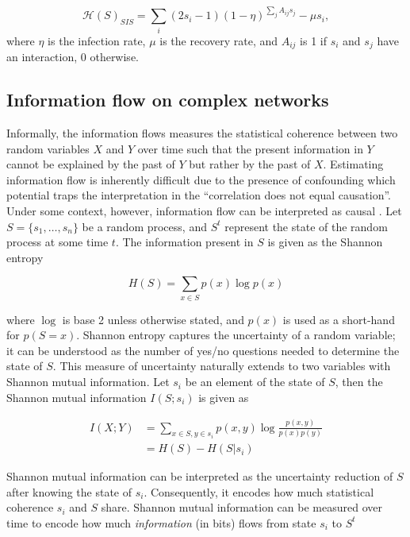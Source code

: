 \documentclass[a4paper, 11pt, twocolumn]{article}
\begin{document}
\begin{equation}
\label{eq:sis}
\mathcal{H}(S)_{SIS} = \sum_i (2s_i - 1) (1 - \eta)^{\sum_{j} A_{ij} s_j} - \mu s_i,
\end{equation}
where $\eta$ is  the infection rate, $\mu$ is  the recovery rate,
and $A_{ij}$ is 1 if $s_i$ and $s_j$ have an interaction, 0
otherwise.

\subsection{Information flow on complex networks}
\label{sec:org3d3e541}
Informally, the  information flows measures  the statistical
coherence between two random variables $X$ and $Y$ over time
such that the present information in $Y$ cannot be explained
by the past of $Y$ but rather by the past of $X$. Estimating
information flow is inherently difficult due to the presence
of confounding  which potential traps the  interpretation in
the  ``correlation  does  not equal  causation''.  Under  some
context,  however, information  flow can  be interpreted  as
causal \cite{vanElteren2021}. Let $S=\{s_1, \dots, s_n\}$ be a
random process, and $S^t$ represent  the state of the random
process at some time $t$.  The information present in $S$ is
given as the Shannon entropy

\begin{equation}
H(S) = \sum_{x \in S} p(x) \log p(x)
\end{equation}

where $\log$ is  base 2 unless otherwise  stated, and $p(x)$
is  used as  a short-hand  for $p(S  = x)$.  Shannon entropy
captures the  uncertainty of  a random  variable; it  can be
understood  as  the number  of  yes/no  questions needed  to
determine  the state  of  $S$. This  measure of  uncertainty
naturally  extends  to  two variables  with  Shannon  mutual
information. Let  $s_i$ be an  element of the state  of $S$,
then the Shannon mutual information $I(S; s_i)$ is given as

\begin{equation}
\begin{aligned}
I(X; Y) &= \sum_{x\in S, y \in s_i} p(x,y) \log \frac{p(x,y)}{p(x)p(y)}\\
        &= H(S) - H(S | s_i)
\end{aligned}
\end{equation}

Shannon  mutual   information  can  be  interpreted   as  the
uncertainty reduction of $S$ after knowing the state of $s_i$.
Consequently, it encodes how  much statistical coherence $s_i$
and $S$ share.  Shannon mutual  information can be
measured over time to  encode how  much \emph{information} (in  bits) flows
from state $s_i$ to $S^{t}$
\end{document}
